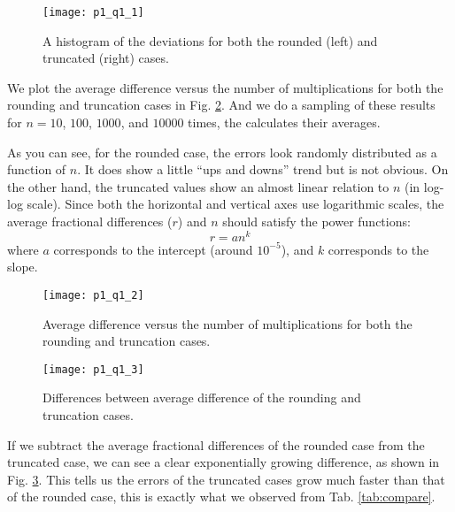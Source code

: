 \begin{figure}
    \centering
    \texttt{[image: p1\_q1\_1]}
    \caption{A histogram of the deviations for both the rounded (left) and
        truncated (right) cases.}
    \label{fig:histogram}
\end{figure}

We plot the average difference versus the number of multiplications for both the
rounding and truncation cases in Fig. \ref{fig:compare_rounding_truncation}.
And we do a sampling of these results for $n = 10$, $100$, $1000$, and $10000$ times,
the calculates their averages.

As you can see, for the rounded case, the errors look randomly distributed as a function
of $n$. It does show a little ``ups and downs'' trend but is not obvious.
On the other hand, the truncated values show an almost linear relation to $n$ (in log-log scale).
Since both the horizontal and vertical axes use logarithmic scales, the average
fractional differences ($r$) and $n$ should satisfy the power functions:
%
\begin{equation}
    r = a n^k
\end{equation}
%
where $a$ corresponds to the intercept (around $10^{-5}$), and $k$ corresponds to the
slope.

\begin{figure}
    \centering
    \texttt{[image: p1\_q1\_2]}
    \caption{Average difference versus the number of multiplications for both
        the rounding and truncation cases.}
    \label{fig:compare_rounding_truncation}
\end{figure}

\begin{figure}[H]
    \centering
    \texttt{[image: p1\_q1\_3]}
    \caption{Differences between average difference of the rounding and truncation cases.}
    \label{fig:diff_rounding_truncation}
\end{figure}

If we subtract the average fractional differences of the rounded case from the
truncated case, we can see a clear exponentially growing difference, as shown in
Fig. \ref{fig:diff_rounding_truncation}. This tells us the errors of the truncated
cases grow much faster than that of the rounded case, this is exactly what we observed
from Tab. \ref{tab:compare}.

\newpage
